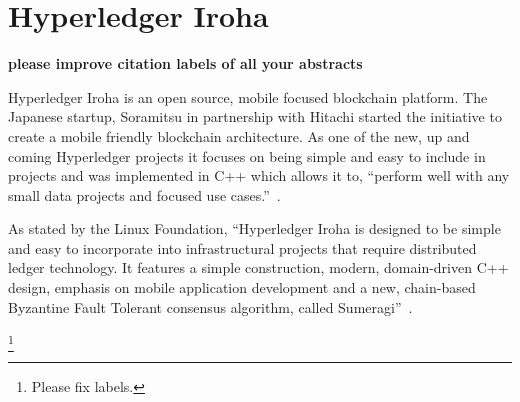 \section{Hyperledger Iroha}

{\bf please improve citation labels of all your abstracts}

Hyperledger Iroha is an open source, mobile focused blockchain
platform.  The Japanese startup, Soramitsu in partnership with Hitachi
started the initiative to create a mobile friendly blockchain
architecture. As one of the new, up and coming Hyperledger projects it
focuses on being simple and easy to include in projects and was
implemented in C++ which allows it to, ``perform well with any small
data projects and focused use cases.''~\cite{Behlendorf}.

As stated by the Linux Foundation, ``Hyperledger Iroha is designed to
be simple and easy to incorporate into infrastructural projects that
require distributed ledger technology. It features a simple
construction, modern, domain-driven C++ design, emphasis on mobile
application development and a new, chain-based Byzantine Fault
Tolerant consensus algorithm, called 
Sumeragi''~\cite{Active Status Iroha}.

\footnote{Please fix labels.}